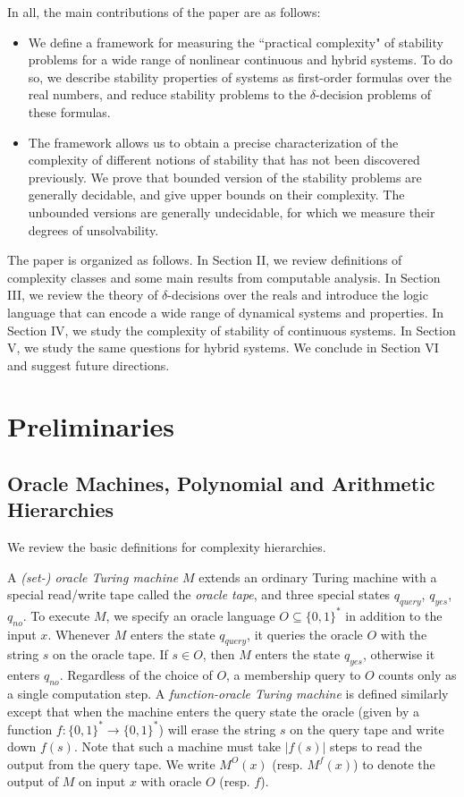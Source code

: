 \documentclass[10pt]{article}
\theoremstyle{plain}
\theoremstyle{definition}
\begin{document}
In all, the main contributions of the paper are as follows:
\begin{itemize}
\item We define a framework for measuring the ``practical complexity" of stability problems for a wide range of nonlinear continuous and hybrid systems. To do so, we describe stability properties of systems as first-order formulas over the real numbers, and reduce stability problems to the $\delta$-decision problems of these formulas. 
\item The framework allows us to obtain a precise characterization of the complexity of different notions of stability that has not been discovered previously. We prove that bounded version of the stability problems are generally decidable, and give upper bounds on their complexity. The unbounded versions are generally undecidable, for which we measure their degrees of unsolvability. 
\end{itemize}
The paper is organized as follows. In Section II, we review definitions of complexity classes and some main results from computable analysis. In Section III, we review the theory of $\delta$-decisions over the reals and introduce the logic language that can encode a wide range of dynamical systems and properties. In Section IV, we study the complexity of stability of continuous systems. In Section V, we study the same questions for hybrid systems. We conclude in Section VI and suggest future directions. 

\section{Preliminaries}
\subsection{Oracle Machines, Polynomial and Arithmetic Hierarchies}

We review the basic definitions for complexity hierarchies. 

A {\em (set-) oracle Turing machine} $M$ extends an ordinary Turing machine with a special read/write tape called the {\em oracle tape}, and three special states $q_{\mathit{query}}$, $q_{\mathit{yes}}$, $q_{\mathit{no}}$. To execute $M$, we specify an oracle language $O\subseteq \{0,1\}^*$ in addition to the input $x$. Whenever $M$ enters the state $q_{\mathit{query}}$, it queries the oracle $O$ with the string $s$ on the oracle tape. If $s\in O$, then $M$ enters the state $q_{\mathit{yes}}$, otherwise it enters $q_{\mathit{no}}$. Regardless of the choice of $O$, a membership query to $O$ counts only as a single computation step. A {\em function-oracle Turing machine} is defined similarly except that when the machine enters the query state the oracle (given by a function $f:\{0,1\}^*\rightarrow\{0,1\}^*$) will erase the string $s$ on the query tape and write down $f(s)$. Note that such a machine must take $|f(s)|$ steps to read the output from the query tape. We write $M^O(x)$ (resp. $M^f(x)$) to denote the output of $M$ on input $x$ with oracle $O$ (resp. $f$). 
\end{document}
